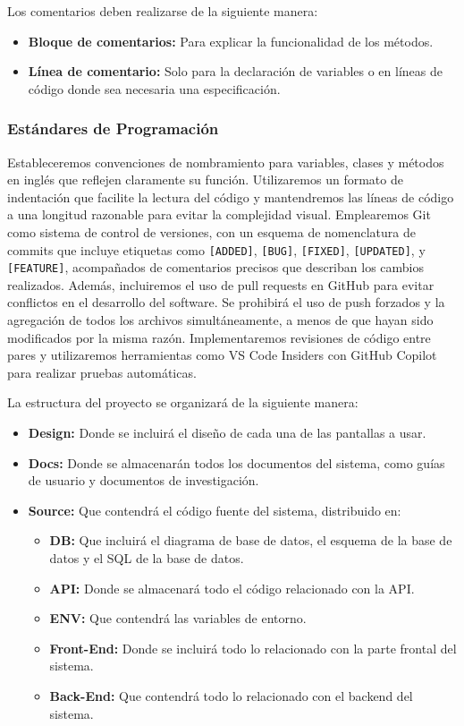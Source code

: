 Los comentarios deben realizarse de la siguiente manera:
\begin{itemize}
    \item \textbf{Bloque de comentarios:} Para explicar la funcionalidad de los métodos.
    \item \textbf{Línea de comentario:} Solo para la declaración de variables o en líneas de 
    código donde sea necesaria una especificación.
\end{itemize}

\subsubsection*{\textbf{Estándares de Programación}}

Estableceremos convenciones de nombramiento para variables, clases y métodos en 
inglés que reflejen claramente su función. Utilizaremos un formato de indentación que 
facilite la lectura del código y mantendremos las líneas de código a una longitud razonable 
para evitar la complejidad visual. Emplearemos Git como sistema de control de versiones, con un 
esquema de nomenclatura de commits que incluye etiquetas como \texttt{[ADDED]}, \texttt{[BUG]}, 
\texttt{[FIXED]}, \texttt{[UPDATED]}, y \texttt{[FEATURE]}, acompañados de comentarios precisos 
que describan los cambios realizados. Además, incluiremos el uso de pull requests en GitHub para 
evitar conflictos en el desarrollo del software. Se prohibirá el uso de push forzados y la 
agregación de todos los archivos simultáneamente, a menos de que hayan sido modificados 
por la misma razón. Implementaremos revisiones de código entre pares y utilizaremos 
herramientas como VS Code Insiders con GitHub Copilot para realizar pruebas automáticas.

La estructura del proyecto se organizará de la siguiente manera: 
\begin{itemize}
    \item \textbf{Design:} Donde se incluirá el diseño de cada una de las pantallas a usar.
    \item \textbf{Docs:} Donde se almacenarán todos los documentos del sistema, como guías 
    de usuario y documentos de investigación.
    \item \textbf{Source:} Que contendrá el código fuente del sistema, distribuido en:
    \begin{itemize}
        \item \textbf{DB:} Que incluirá el diagrama de base de datos, el esquema de la 
        base de datos y el SQL de la base de datos.
        \item \textbf{API:} Donde se almacenará todo el código relacionado con la API.
        \item \textbf{ENV:} Que contendrá las variables de entorno.
        \item \textbf{Front-End:} Donde se incluirá todo lo relacionado con la parte frontal 
        del sistema.
        \item \textbf{Back-End:} Que contendrá todo lo relacionado con el backend del sistema.
    \end{itemize}
\end{itemize}

